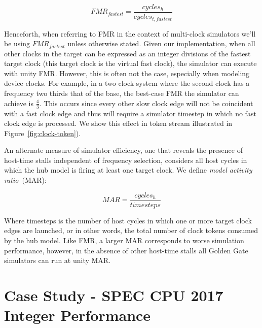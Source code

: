 \begin{equation}
    FMR_{fastest} = \frac{cycles_{h}}{cycles_{t,fastest}}
\end{equation}\label{eq:fmr-fastest}

Henceforth, when referring to FMR in the context of multi-clock simulators we'll
be using $FMR_{fastest}$ unless otherwise stated.  Given our implementation,
when all other clocks in the target can be expressed as an integer divisions of
the fastest target clock (this target clock is the virtual fast clock), the
simulator can execute with unity FMR. However, this is often not the case, especially
when modeling device clocks. For example, in a two clock system where the
second clock has a frequency two thirds that of the base, the best-case FMR the
simulator can achieve is $\frac{4}{3}$. This occurs since every other slow clock edge will not be
coincident with a fast clock edge and thus will require a simulator timestep in which no fast clock edge is processed.
We show this effect in token stream illustrated in Figure~\ref{fig:clock-token}).

An alternate measure of simulator efficiency, one that reveals the presence of
host-time stalls independent of frequency selection, considers all host cycles in
which the hub model is firing at least one target clock. We define \emph{model
activity ratio}~(MAR):

\begin{equation}
    MAR = \frac{cycles_h}{timesteps}
\end{equation}\label{eq:mar}

Where timesteps is the number of host cycles in which one or more target
clock edges are launched, or in other words, the total number of clock tokens
consumed by the hub model. Like FMR, a larger MAR corresponds to worse
simulation performance, however, in the absence of other host-time stalls all
Golden Gate simulators can run at unity MAR.



\section{Case Study - SPEC CPU 2017 Integer Performance}\label{sec:spec-perf}

